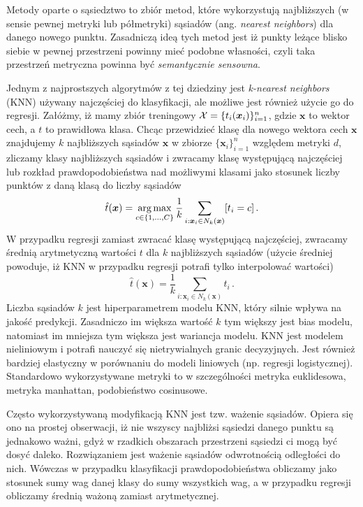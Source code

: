 \documentclass{myclass}
\begin{document}
Metody oparte o sąsiedztwo to zbiór metod, które wykorzystują najbliższych (w sensie pewnej metryki
lub półmetryki) sąsiadów (ang. \emph{nearest neighbors}) dla danego nowego punktu. Zasadniczą
ideą tych metod jest iż punkty leżące blisko siebie w pewnej przestrzeni powinny mieć podobne
własności, czyli taka przestrzeń metryczna powinna być \emph{semantycznie sensowna}.

Jednym z najprostszych algorytmów z tej dziedziny jest \emph{k-nearest neighbors} (KNN) używany
najczęściej do klasyfikacji, ale możliwe jest również użycie go do regresji. Załóżmy, iż mamy zbiór
treningowy \(\mathcal{X} = \{t_i(\bm{x}_i)\}_{i=1}^n\), gdzie \(\mathbf{x}\) to wektor cech, a \(t\) to
prawidłowa klasa. Chcąc przewidzieć klasę dla nowego wektora cech \(\mathbf{x}\) znajdujemy \(k\)
najbliższych sąsiadów \(\mathbf{x}\) w zbiorze \(\{\bm{x}_i\}_{i=1}^n\) względem metryki \(d\),
zliczamy klasy najbliższych sąsiadów i zwracamy klasę występującą najczęściej lub rozkład
prawdopodobieństwa nad możliwymi klasami jako stosunek liczby punktów z daną klasą do liczby
sąsiadów
\[
    \hat{t}(\bm{x}) = \operatorname*{arg\,max}_{c \in \{1, \ldots, C\}} \frac{1}{k}\sum_{i: \bm{x}_i \in N_k(\bm{x})} [t_i = c]\,.
\]
W przypadku regresji zamiast zwracać klasę występującą najczęściej, zwracamy średnią arytmetyczną
wartości \(t\) dla \(k\) najbliższych sąsiadów (użycie średniej powoduje, iż KNN w przypadku
regresji potrafi tylko interpolować wartości)
\[
    \hat{t}(\bm{x}) = \frac{1}{k}\sum_{i: \bm{x}_i \in N_k(\bm{x})} t_i\,.
\]
Liczba sąsiadów \(k\) jest hiperparametrem modelu KNN, który silnie wpływa na jakość predykcji.
Zasadniczo im większa wartość \(k\) tym większy jest bias modelu, natomiast im mniejsza tym większa
jest wariancja modelu. KNN jest modelem nieliniowym i potrafi nauczyć się nietrywialnych granic
decyzyjnych. Jest również bardziej elastyczny w porównaniu do modeli liniowych (np. regresji
logistycznej). Standardowo wykorzystywane metryki to w szczególności metryka euklidesowa, metryka
manhattan, podobieństwo cosinusowe.

Często wykorzystywaną modyfikacją KNN jest tzw. ważenie sąsiadów. Opiera się ono na prostej
obserwacji, iż nie wszyscy najbliżsi sąsiedzi danego punktu są jednakowo ważni, gdyż w rzadkich
obszarach przestrzeni sąsiedzi ci mogą być dosyć daleko. Rozwiązaniem jest ważenie sąsiadów
odwrotnością odległości do nich. Wówczas w przypadku klasyfikacji prawdopodobieństwa obliczamy jako
stosunek sumy wag danej klasy do sumy wszystkich wag, a w przypadku regresji obliczamy średnią
ważoną zamiast arytmetycznej.
\end{document}
